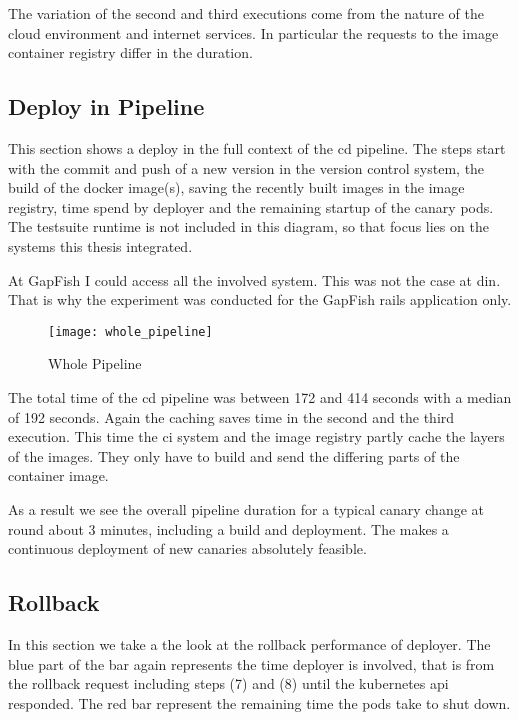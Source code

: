 The variation of the second and third executions come from the nature of the cloud
environment and internet services. In particular the requests to the image container
registry differ in the duration.

\subsection{Deploy in Pipeline}

This section shows a deploy in the full context of the \gls{cd} pipeline. The steps start
with the commit and push of a new version in the version control system, the build of the
docker image(s), saving the recently built images in the image registry, time spend by
deployer and the remaining startup of the canary pods. The testsuite runtime is not
included in this diagram, so that focus lies on the systems this thesis integrated.

At GapFish I could access all the involved system. This was not the case at \gls{din}. That is
why the experiment was conducted for the GapFish rails application only.

\begin{figure}[htbp]
  \centering
  \texttt{[image: whole\_pipeline]}
  \caption[Metric Comparison]{Whole Pipeline}
  \label{fig:whole pipeline}
\end{figure}

The total time of the \gls{cd} pipeline was between 172 and 414 seconds with a median of
192 seconds. Again the caching saves time in the second and the third execution. This time
the \gls{ci} system and the image registry partly cache the layers of the images. They
only have to build and send the differing parts of the container image.

As a result we see the overall pipeline duration for a typical canary change at round
about 3 minutes, including a build and deployment. The makes a continuous deployment of
new canaries absolutely feasible.

\subsection{Rollback}

In this section we take a the look at the rollback performance of deployer. The blue part
of the bar again represents the time deployer is involved, that is from the rollback
request including steps (7) and (8) until the kubernetes api responded. The red bar
represent the remaining time the pods take to shut down.

